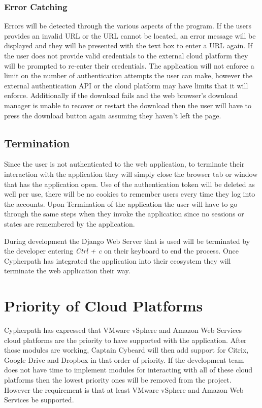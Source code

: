 \documentclass{article}
\begin{document}
            \subsubsection{Error Catching}
            Errors will be detected through the various aspects of the program. If the users provides an invalid URL or the URL cannot be located, an error message will be displayed and they will be presented with
            the text box to enter a URL again. If the user does not provide valid credentials to the external cloud platform they will be prompted to re-enter their credentials.
            The application will not enforce a limit on the number of authentication attempts the user can make, however the external authentication API or the cloud platform may have limits that it will enforce.
            Additionally if the download fails and the web browser's download manager is unable to recover or restart the download then the user will have to press the download button again assuming they haven't left
            the page.

        \subsection{Termination}
        Since the user is not authenticated to the web application, to terminate their interaction with the application they will simply close the browser tab or window that has the
        application open. Use of the authentication token will be deleted as well per use, there will be no cookies to remember users every time they log into the accounts. Upon Termination
        of the application the user will have to go through the same steps when they invoke the application since no sessions or states are remembered by the application.

        During development the Django Web Server that is used will be terminated by the developer entering \textit{Ctrl + c} on their keyboard to end the process. Once Cypherpath has integrated the application into
        their ecosystem they will terminate the web application their way.

    \section{Priority of Cloud Platforms}
    Cypherpath has expressed that VMware vSphere and Amazon Web Services cloud platforms are the priority to have supported with the application. After those modules are working, Captain Cybeard will then add support
    for Citrix, Google Drive and Dropbox in that order of priority. If the development team does not have time to implement modules for interacting with all of these cloud platforms then the lowest priority ones will be removed
    from the project. However the requirement is that at least VMware vSphere and Amazon Web Services be supported.
\end{document}
